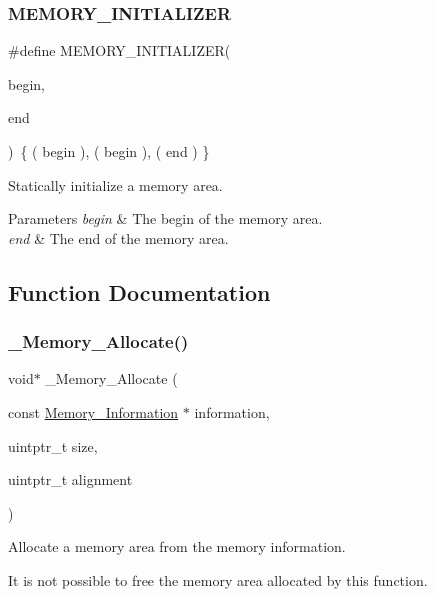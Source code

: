 \subsubsection{\texorpdfstring{MEMORY\_INITIALIZER}{MEMORY\_INITIALIZER}}
{\footnotesize\ttfamily \#define M\+E\+M\+O\+R\+Y\+\_\+\+I\+N\+I\+T\+I\+A\+L\+I\+Z\+ER(\begin{DoxyParamCaption}\item[{}]{begin,  }\item[{}]{end }\end{DoxyParamCaption})~\{ ( begin ), ( begin ), ( end ) \}}



Statically initialize a memory area. 


\begin{DoxyParams}{Parameters}
{\em begin} & The begin of the memory area. \\
\hline
{\em end} & The end of the memory area. \\
\hline
\end{DoxyParams}


\subsection{Function Documentation}
\mbox{\label{group__RTEMSScoreMemory_ga6ae667842e4629a82cf6b093f5bdfe40}} 
\subsubsection{\texorpdfstring{\_Memory\_Allocate()}{\_Memory\_Allocate()}}
{\footnotesize\ttfamily void$\ast$ \+\_\+\+Memory\+\_\+\+Allocate (\begin{DoxyParamCaption}\item[{const \mbox{\hyperlink{structMemory__Information}{Memory\+\_\+\+Information}} $\ast$}]{information,  }\item[{uintptr\+\_\+t}]{size,  }\item[{uintptr\+\_\+t}]{alignment }\end{DoxyParamCaption})}



Allocate a memory area from the memory information. 

It is not possible to free the memory area allocated by this function.


